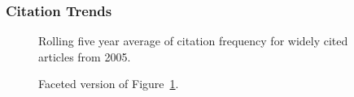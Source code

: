 \documentclass[
  10pt,
  letterpaper,
  DIV=11,
  numbers=noendperiod,
  twoside]{scrartcl}
\begin{document}
\subsubsection*{Citation Trends}\label{citation-trends-29}

\begin{figure}


\caption{\label{fig-citation-spaghetti-2005}Rolling five year average of
citation frequency for widely cited articles from 2005.}

\end{figure}%

\begin{figure}


\caption{\label{fig-citation-facet-2005}Faceted version of
Figure~\ref{fig-citation-spaghetti-2005}.}

\end{figure}%
\end{document}
